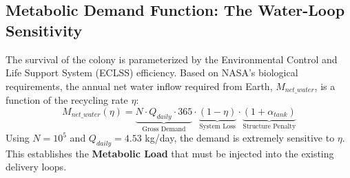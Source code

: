 \documentclass{mcmthesis}
\begin{document}
\subsection{Metabolic Demand Function: The Water-Loop Sensitivity}
The survival of the colony is parameterized by the Environmental Control and Life Support System (ECLSS) efficiency. Based on NASA's biological requirements, the annual net water inflow required from Earth, $M_{net\_water}$, is a function of the recycling rate $\eta$:
\begin{equation}
	M_{net\_water}(\eta) = \underbrace{N \cdot Q_{daily} \cdot 365}_{\text{Gross Demand}} \cdot \underbrace{(1 - \eta)}_{\text{System Loss}} \cdot \underbrace{(1 + \alpha_{tank})}_{\text{Structure Penalty}}
\end{equation}
Using $N=10^5$ and $Q_{daily}=4.53$ kg/day, the demand is extremely sensitive to $\eta$. This establishes the \textbf{Metabolic Load} that must be injected into the existing delivery loops.
\end{document}
